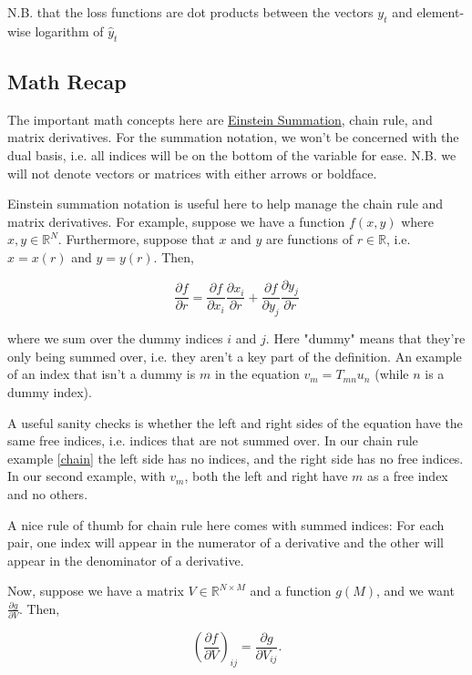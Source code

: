 \documentclass[11pt,twoside]{article}
\begin{document}
\noindent N.B. that the loss functions are dot products between the vectors $y_t$ and element-wise logarithm of $\hat{y}_t$


\subsection{Math Recap}
The important math concepts here are \href{http://planetmath.org/einsteinsummationconvention}{Einstein Summation}, chain rule, and matrix derivatives. For the summation notation, we won't be concerned with the dual basis, i.e. all indices will be on the bottom of the variable for ease. N.B. we will not denote vectors or matrices with either arrows or boldface.

Einstein summation notation is useful here to help manage the chain rule and matrix derivatives. For example, suppose we have a function $f(x,y)$ where $x,y\in \mathbb{R}^N$. Furthermore, suppose that $x$ and $y$ are functions of $r\in\mathbb{R}$, i.e. $x=x(r)$ and $y=y(r)$. Then,

\begin{equation}
\label{chain}
\frac{\partial f}{\partial r}=\frac{\partial f}{\partial x_i}\frac{\partial x_i}{\partial r}+\frac{\partial f}{\partial y_j}\frac{\partial y_j}{\partial r}
\end{equation}

\noindent where we sum over the dummy indices $i$ and $j$. Here "dummy" means that they're only being summed over, i.e. they aren't a key part of the definition. An example of an index that isn't a dummy is $m$ in the equation $v_m=T_{m n} u_n$ (while $n$ is a dummy index).

A useful sanity checks is whether the left and right sides of the equation have the same free indices, i.e. indices that are not summed over. In our chain rule example \eqref{chain} the left side has no indices, and the right side has no free indices. In our second example, with $v_m$, both the left and right have $m$ as a free index and no others.

A nice rule of thumb for chain rule here comes with summed indices: For each pair, one index will appear in the numerator of a derivative and the other will appear in the denominator of a derivative.

Now, suppose we have a matrix $V\in\mathbb{R}^{N\times M}$ and a function $g(M)$, and we want $\frac{\partial g}{\partial V}$. Then,

\begin{equation}
\label{matcalc}
\left( \frac{\partial f}{\partial V}\right)_{i j}=\frac{\partial g}{\partial V_{i j}}.
\end{equation}
\end{document}
